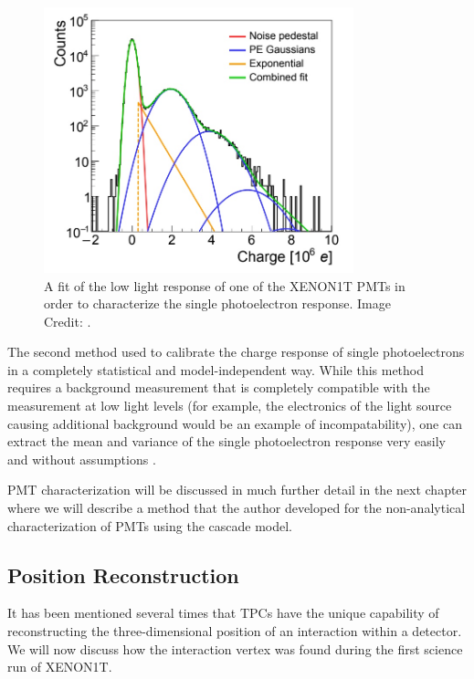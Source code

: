 \begin{figure}[t]
	\centering
	\includegraphics[width=0.8\textwidth]{xe1t_spe_gaussian}
	\caption{A fit of the low light response of one of the XENON1T PMTs in order to characterize the single photoelectron response.  Image Credit: .}
	\label{fig:xe1t_spe_gaussian}
\end{figure}


The second method used to calibrate the charge response of single photoelectrons in a completely statistical and model-independent way.  While this method requires a background measurement that is completely compatible with the measurement at low light levels (for example, the electronics of the light source causing additional background would be an example of incompatability), one can extract the mean and variance of the single photoelectron response very easily and without assumptions \cite{saldanha2017model}.

PMT characterization will be discussed in much further detail in the next chapter where we will describe a method that the author developed for the non-analytical characterization of PMTs using the cascade model.




\subsection{Position Reconstruction}
\label{sec:xe1t_pos_rec}

It has been mentioned several times that TPCs have the unique capability of reconstructing the three-dimensional position of an interaction within a detector.  We will now discuss how the interaction vertex was found during the first science run of XENON1T.

